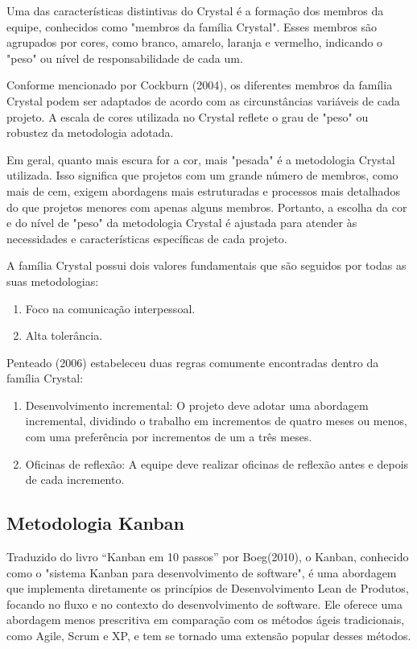 Uma das características distintivas do Crystal é a formação dos membros da equipe, conhecidos como "membros da família Crystal". Esses membros são agrupados por cores, como branco, amarelo, laranja e vermelho, indicando o "peso" ou nível de responsabilidade de cada um.

Conforme mencionado por Cockburn (2004), os diferentes membros da família Crystal podem ser adaptados de acordo com as circunstâncias variáveis de cada projeto. A escala de cores utilizada no Crystal reflete o grau de "peso" ou robustez da metodologia adotada.

Em geral, quanto mais escura for a cor, mais "pesada" é a metodologia Crystal utilizada. Isso significa que projetos com um grande número de membros, como mais de cem, exigem abordagens mais estruturadas e processos mais detalhados do que projetos menores com apenas alguns membros. Portanto, a escolha da cor e do nível de "peso" da metodologia Crystal é ajustada para atender às necessidades e características específicas de cada projeto.

A família Crystal possui dois valores fundamentais que são seguidos por todas as suas metodologias:

\begin{enumerate}[label=\Roman*.]
	\item Foco na comunicação interpessoal.
	\item Alta tolerância.
\end{enumerate}

Penteado (2006) estabeleceu duas regras comumente encontradas dentro da família Crystal:

\begin{enumerate}[label=\Roman*.]
	\item Desenvolvimento incremental: O projeto deve adotar uma abordagem incremental, dividindo o trabalho em incrementos de quatro meses ou menos, com uma preferência por incrementos de um a três meses.
	\item Oficinas de reflexão: A equipe deve realizar oficinas de reflexão antes e depois de cada incremento.
\end{enumerate}

\subsection{Metodologia Kanban}

Traduzido do livro “Kanban em 10 passos” por Boeg(2010), o Kanban, conhecido como o "sistema Kanban para desenvolvimento de software", é uma abordagem que implementa diretamente os princípios de Desenvolvimento Lean de Produtos, focando no fluxo e no contexto do desenvolvimento de software. Ele oferece uma abordagem menos prescritiva em comparação com os métodos ágeis tradicionais, como Agile, Scrum e XP, e tem se tornado uma extensão popular desses métodos.

